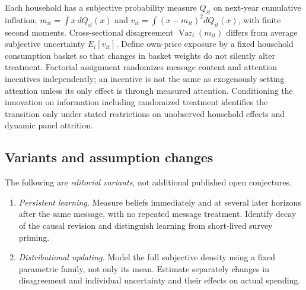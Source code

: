 \documentclass[11pt,a4paper]{article}
\begin{document}
Each household has a subjective probability measure \(Q_{it}\) on next-year cumulative inflation; \(m_{it}=\int x\,dQ_{it}(x)\) and \(v_{it}=\int(x-m_{it})^2dQ_{it}(x)\), with finite second moments. Cross-sectional disagreement \(\operatorname{Var}_i(m_{it})\) differs from average subjective uncertainty \(E_i[v_{it}]\). Define own-price exposure by a fixed household consumption basket so that changes in basket weights do not silently alter treatment. Factorial assignment randomizes message content and attention incentives independently; an incentive is not the same as exogenously setting attention unless its only effect is through measured attention. Conditioning the innovation on information including randomized treatment identifies the transition only under stated restrictions on unobserved household effects and dynamic panel attrition.
\subsection*{Variants and assumption changes}
The following are \emph{editorial variants}, not additional published open conjectures.
\begin{enumerate}
\item \emph{Persistent learning.} Measure beliefs immediately and at several later horizons after the same message, with no repeated message treatment. Identify decay of the causal revision and distinguish learning from short-lived survey priming.
\item \emph{Distributional updating.} Model the full subjective density using a fixed parametric family, not only its mean. Estimate separately changes in disagreement and individual uncertainty and their effects on actual spending.
\end{enumerate}
\end{document}
